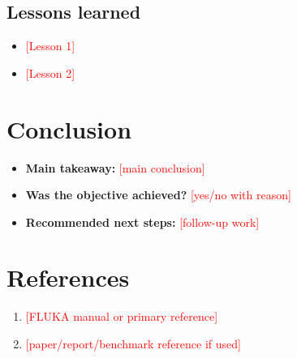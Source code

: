 \documentclass[11pt]{article}
\newcommand{\placeholder}[1]{\textcolor{red}{[#1]}}
\begin{document}
\subsection{Lessons learned}
\label{sec:lessons}
\begin{itemize}[leftmargin=1.5em]
  \item \placeholder{Lesson 1}
  \item \placeholder{Lesson 2}
\end{itemize}

\section{Conclusion}
\label{sec:conclusion}
\begin{itemize}[leftmargin=1.5em]
  \item \textbf{Main takeaway:} \placeholder{main conclusion}
  \item \textbf{Was the objective achieved?} \placeholder{yes/no with reason}
  \item \textbf{Recommended next steps:} \placeholder{follow-up work}
\end{itemize}

\section*{References}
\begin{enumerate}[leftmargin=1.8em]
  \item \placeholder{FLUKA manual or primary reference}
  \item \placeholder{paper/report/benchmark reference if used}
\end{enumerate}
\end{document}
